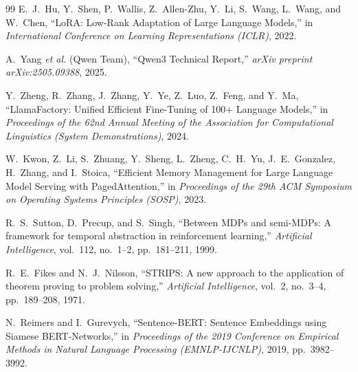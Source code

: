 \documentclass[14pt]{article}
\begin{document}
\begin{thebibliography}{99}
E.~J.~Hu, Y.~Shen, P.~Wallis, Z.~Allen-Zhu, Y.~Li, S.~Wang, L.~Wang, and W.~Chen,
``{LoRA}: Low-Rank Adaptation of Large Language Models,''
in \textit{International Conference on Learning Representations (ICLR)},
2022.

A.~Yang \textit{et al.} (Qwen Team),
``{Qwen3} Technical Report,''
\textit{arXiv preprint arXiv:2505.09388},
2025.

Y.~Zheng, R.~Zhang, J.~Zhang, Y.~Ye, Z.~Luo, Z.~Feng, and Y.~Ma,
``{LlamaFactory}: Unified Efficient Fine-Tuning of 100+ Language Models,''
in \textit{Proceedings of the 62nd Annual Meeting of the Association for Computational Linguistics (System Demonstrations)},
2024.

W.~Kwon, Z.~Li, S.~Zhuang, Y.~Sheng, L.~Zheng, C.~H.~Yu, J.~E.~Gonzalez, H.~Zhang, and I.~Stoica,
``Efficient Memory Management for Large Language Model Serving with {PagedAttention},''
in \textit{Proceedings of the 29th ACM Symposium on Operating Systems Principles (SOSP)},
2023.

R.~S.~Sutton, D.~Precup, and S.~Singh,
``Between {MDPs} and semi-{MDPs}: A framework for temporal abstraction in reinforcement learning,''
\textit{Artificial Intelligence},
vol.~112, no.~1--2, pp.~181--211, 1999.

R.~E.~Fikes and N.~J.~Nilsson,
``{STRIPS}: A new approach to the application of theorem proving to problem solving,''
\textit{Artificial Intelligence},
vol.~2, no.~3--4, pp.~189--208, 1971.

N.~Reimers and I.~Gurevych,
``Sentence-{BERT}: Sentence Embeddings using Siamese {BERT}-Networks,''
in \textit{Proceedings of the 2019 Conference on Empirical Methods in Natural Language Processing (EMNLP-IJCNLP)},
2019, pp.~3982--3992.

\end{thebibliography}
\end{document}
